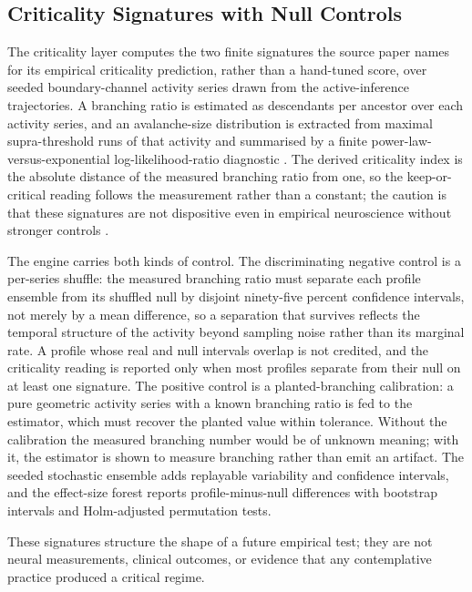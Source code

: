 \documentclass[
]{article}
\begin{document}
\subsection{Criticality Signatures with Null
Controls}\label{sec:supplement-criticality-indicators}

The criticality layer computes the two finite signatures the source
paper names for its empirical criticality prediction, rather than a
hand-tuned score, over seeded boundary-channel activity series drawn
from the active-inference trajectories. A branching ratio is estimated
as descendants per ancestor over each activity series, and an
avalanche-size distribution is extracted from maximal supra-threshold
runs of that activity and summarised by a finite
power-law-versus-exponential log-likelihood-ratio diagnostic
\citep{beggs2003neuronal}. The derived criticality index is the absolute
distance of the measured branching ratio from one, so the
keep-or-critical reading follows the measurement rather than a constant;
the caution is that these signatures are not dispositive even in
empirical neuroscience without stronger controls
\citep{touboul2017power_law_absence_criticality, destexhe2021criticality_evidence}.

The engine carries both kinds of control. The discriminating negative
control is a per-series shuffle: the measured branching ratio must
separate each profile ensemble from its shuffled null by disjoint
ninety-five percent confidence intervals, not merely by a mean
difference, so a separation that survives reflects the temporal
structure of the activity beyond sampling noise rather than its marginal
rate. A profile whose real and null intervals overlap is not credited,
and the criticality reading is reported only when most profiles separate
from their null on at least one signature. The positive control is a
planted-branching calibration: a pure geometric activity series with a
known branching ratio is fed to the estimator, which must recover the
planted value within tolerance. Without the calibration the measured
branching number would be of unknown meaning; with it, the estimator is
shown to measure branching rather than emit an artifact. The seeded
stochastic ensemble adds replayable variability and confidence
intervals, and the effect-size forest reports profile-minus-null
differences with bootstrap intervals and Holm-adjusted permutation
tests.

These signatures structure the shape of a future empirical test; they
are not neural measurements, clinical outcomes, or evidence that any
contemplative practice produced a critical regime.
\end{document}
